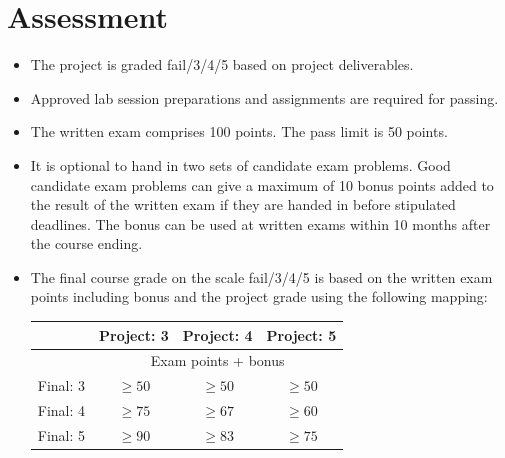 \documentclass[10pt,a4paper]{article}
\begin{document}
\section{Assessment}
\begin{itemize}
\item The project is graded fail/3/4/5 based on project deliverables.
\item Approved lab session preparations and assignments are required for passing.
\item The written exam comprises 100 points. The pass limit is 50 points.
\item It is optional to hand in two sets of candidate exam problems. Good candidate exam problems can give a maximum of 10 bonus points added to the result of the written exam if they are handed in before stipulated deadlines. The bonus can be used at written exams within 10 months after the course ending.
\item The final course grade on the scale fail/3/4/5 is based on the written exam points including bonus and the project grade using the following mapping:

\begin{tabular}{r | c c c}
 & Project: 3 & Project: 4 & Project: 5 \\
\hline
 & \multicolumn{3}{c}{Exam points + bonus}    \\
Final: 3 & $ \geq 50$ & $\geq 50$ & $\geq 50$ \\
Final: 4 & $ \geq 75$ & $\geq 67$ & $\geq 60$ \\
Final: 5 & $ \geq 90$ & $\geq 83$ & $\geq 75$ \\
\hline
\end{tabular}


\end{itemize}
\end{document}

